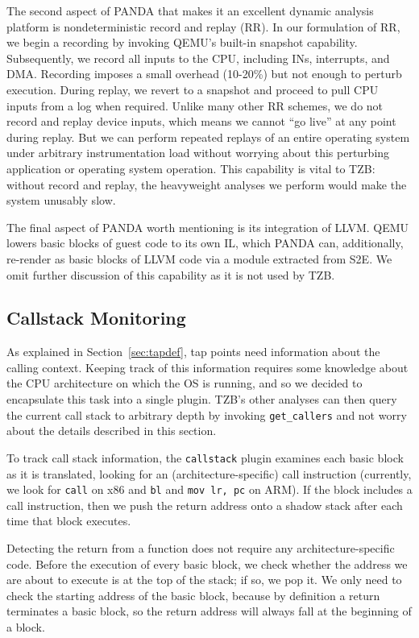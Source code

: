 The second aspect of PANDA that makes it an excellent dynamic analysis
platform is nondeterministic record and replay (RR). In our formulation
of RR, we begin a recording by invoking QEMU's built-in snapshot
capability. Subsequently, we record all inputs to the CPU, including
INs, interrupts, and DMA. Recording imposes a small overhead (10-20\%)
but not enough to perturb execution. During replay, we revert to a
snapshot and proceed to pull CPU inputs from a log when required.
Unlike many other RR schemes, we do not record and replay device inputs,
which means we cannot ``go live'' at any point during replay. But we
can perform repeated replays of an entire operating system under
arbitrary instrumentation load without worrying about this perturbing
application or operating system operation. This capability is vital to
TZB: without record and replay, the heavyweight analyses we perform
would make the system unusably slow.

The final aspect of PANDA worth mentioning is its integration of LLVM.
QEMU lowers basic blocks of guest code to its own IL, which PANDA can,
additionally, re-render as basic blocks of LLVM code via a module 
extracted from S2E. We omit further discussion of this capability
as it is not used by TZB.

\subsection{Callstack Monitoring}
\label{sec:implementation:subsec:callstack}

As explained in Section~\ref{sec:tapdef}, tap points need information
about the calling context. Keeping track of this information requires
some knowledge about the CPU architecture on which the OS is running,
and so we decided to encapsulate this task into a single plugin. TZB's
other analyses can then query the current call stack to arbitrary depth
by invoking \texttt{get\_callers} and not worry about the details
described in this section.

To track call stack information, the \texttt{callstack} plugin examines
each basic block as it is translated, looking for an
(architecture-specific) call instruction (currently, we look for
\texttt{call} on x86 and \texttt{bl} and \texttt{mov lr, pc} on ARM). If
the block includes a call instruction, then we push the return address
onto a shadow stack after each time that block executes.

Detecting the return from a function does not require any
architecture-specific code. Before the execution of every basic block,
we check whether the address we are about to execute is at the top of
the stack; if so, we pop it. We only need to check the starting address
of the basic block, because by definition a return terminates a basic
block, so the return address will always fall at the beginning of a
block.

